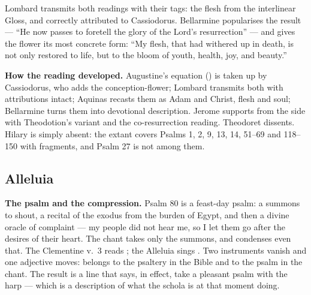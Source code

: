 \begin{witnessnote}
Lombard transmits both readings with their tags: the flesh  from the interlinear Gloss, and  correctly attributed to
Cassiodorus. Bellarmine popularises the result --- ``He now passes to foretell
the glory of the Lord's resurrection'' --- and gives the flower its most
concrete form: ``My flesh, that had withered up in death, is not only restored
to life, but to the bloom of youth, health, joy, and beauty.''
\end{witnessnote}

\textbf{How the reading developed.} Augustine's equation
() is taken up by Cassiodorus, who adds the
conception-flower; Lombard transmits both with attributions intact; Aquinas
recasts them as Adam and Christ, flesh and soul; Bellarmine turns them into
devotional description. Jerome supports from the side with Theodotion's variant
and the co-resurrection reading. Theodoret dissents. Hilary is simply absent:
the extant  covers Psalms 1, 2, 9, 13, 14, 51--69
and 118--150 with fragments, and Psalm 27 is not among them.

\elementguard
\subsection*{Alleluia }


\textbf{The psalm and the compression.} Psalm 80 is a feast-day psalm: a
summons to shout, a recital of the exodus from the burden of Egypt, and then a
divine oracle of complaint --- my people did not hear me, so I let them go
after the desires of their heart. The chant takes only the summons, and
condenses even that. The Clementine v.~3 reads ; the Alleluia sings . Two instruments vanish and one adjective moves:
 belongs to the psaltery in the Bible and to the psalm in the
chant. The result is a line that says, in effect, take a pleasant psalm with
the harp --- which is a description of what the schola is at that moment doing.

